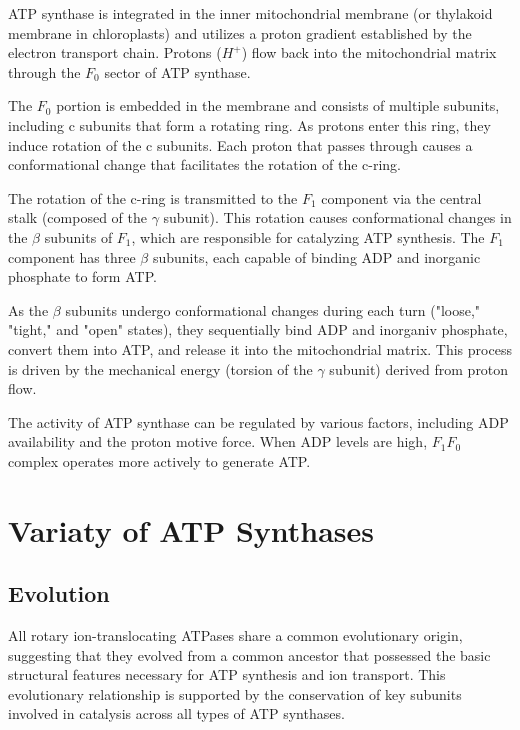 \documentclass{article}
\begin{document}
ATP synthase is integrated in the inner mitochondrial membrane (or thylakoid membrane in chloroplasts) and utilizes a proton gradient established by the electron transport chain. Protons ($H^+$) flow back into the mitochondrial matrix through the \textit{$F_0$} sector of ATP synthase.

The \textit{$F_0$} portion is embedded in the membrane and consists of multiple subunits, including c subunits that form a rotating ring. As protons enter this ring, they induce rotation of the c subunits. Each proton that passes through causes a conformational change that facilitates the rotation of the c-ring.

The rotation of the c-ring is transmitted to the \textit{$F_1$} component via the central stalk (composed of the $\gamma$ subunit). This rotation causes conformational changes in the $\beta$ subunits of \textit{$F_1$}, which are responsible for catalyzing ATP synthesis. The \textit{$F_1$} component has three $\beta$ subunits, each capable of binding ADP and inorganic phosphate to form ATP.

As the $\beta$ subunits undergo conformational changes during each turn ("loose," "tight," and "open" states), they sequentially bind ADP and inorganiv phosphate, convert them into ATP, and release it into the mitochondrial matrix. This process is driven by the mechanical energy (torsion of the $\gamma$ subunit) derived from proton flow.

The activity of ATP synthase can be regulated by various factors, including ADP availability and the proton motive force. When ADP levels are high, \textit{$F_1F_0$}  complex operates more actively to generate ATP.

\section{Variaty of ATP Synthases}

\subsection{Evolution}

All rotary ion-translocating ATPases share a common evolutionary origin, suggesting that they evolved from a common ancestor that possessed the basic structural features necessary for ATP synthesis and ion transport. This evolutionary relationship is supported by the conservation of key subunits involved in catalysis across all types of ATP synthases.
\end{document}
